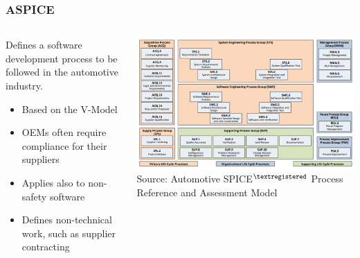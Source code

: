 \begin{frame}
\frametitle{ASPICE}
\begin{columns}[T]
    \begin{column}{0.4\textwidth}
        Defines a software development process to be followed in the automotive
        industry.\\
        \begin{itemize}
            \item Based on the V-Model
            \item OEMs often require compliance for their suppliers
            \item Applies also to non-safety software
            \item Defines non-technical work, such as supplier contracting
        \end{itemize}
    \end{column}
    \begin{column}{0.6\textwidth}
        \centering
        \includegraphics[width=\textwidth]{images/aspice.png}\\
        \footnotesize Source: Automotive SPICE$^{\tiny{\textregistered}}$
            Process Reference and Assessment Model\footnotemark[1]
    \end{column}
\end{columns}
\end{frame}

